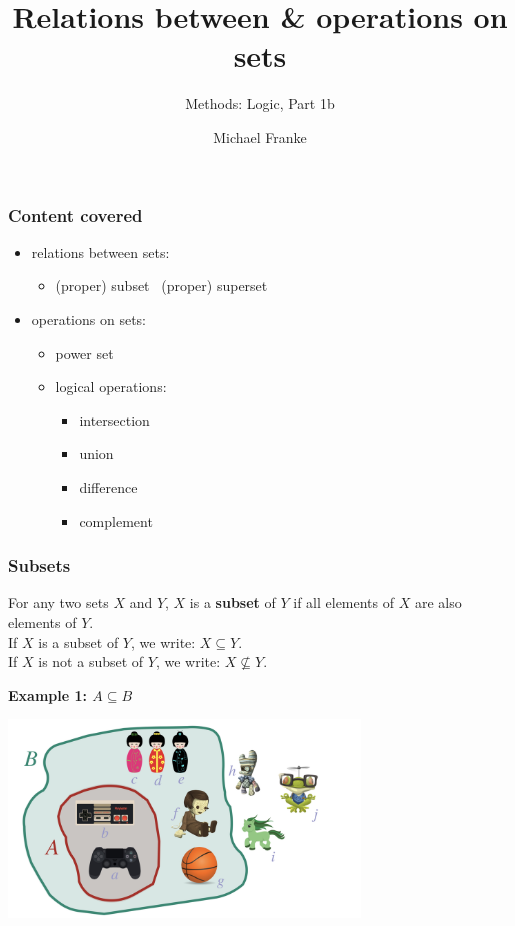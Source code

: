 \documentclass[fleqn,10pt,serif,xcolor=svgnames,xcolor=table,aspectratio=169,handout]{beamer}
\title{Relations between \& operations on sets}
\subtitle{Methods: Logic, Part 1b}
\author{Michael Franke}
\date{}
\begin{document}

\abovedisplayskip=3pt
\abovedisplayshortskip=3pt

\belowdisplayskip=3pt
\belowdisplayshortskip=3pt

\begin{frame}
  \maketitle
\end{frame}

\begin{frame}
  \frametitle{Content covered}

  \begin{itemize}
    \item relations between sets:
    \begin{itemize}
      \item (proper) subset
      \ (proper) superset
    \end{itemize}
    \item operations on sets:
    \begin{itemize}
      \item power set
      \item logical operations:
      \begin{itemize}
        \item intersection
        \item union
        \item difference
        \item complement
      \end{itemize}
    \end{itemize}
  \end{itemize}
\end{frame}

\begin{frame}
  \frametitle{Subsets}

  For any two sets $X$ and $Y$, $X$ is a \textbf{subset} of $Y$ if all elements of $X$ are also elements of $Y$. \\
  If $X$ is a subset of $Y$, we write: $X \subseteq Y$.\\
  If $X$ is not a subset of $Y$, we write: $X \not \subseteq Y$.

  \pause

\hfill  \textbf{Example 1: $A \subseteq B$}

  \hfill \includegraphics[width = 0.7\textwidth]{01b-sets-relations-operations/01b-sets-relations-operations-001.jpeg}

\end{frame}
\end{document}
